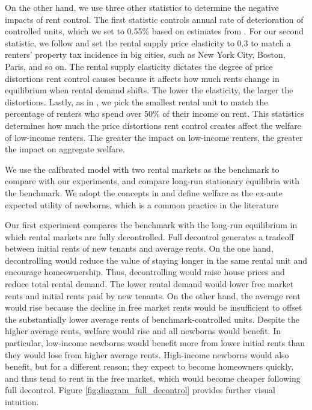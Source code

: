 \documentclass[parskip=full]{article}
\begin{document}
On the other hand, we use three other statistics to determine the negative impacts of rent control. The first statistic controls annual rate of deterioration of controlled units, which we set to 0.55\% based on estimates from \citet{murray_et_al-1991}. For our second statistic, we follow \citet{rs-2023} and set the rental supply price elasticity to 0.3 to match a renters' property tax incidence in big cities, such as New York City, Boston, Paris, and so on. The rental supply elasticity dictates the degree of price distortions rent control causes because it affects how much rents change in equilibrium when rental demand shifts. The lower the elasticity, the larger the distortions. Lastly, as in \citet{rs-2023}, we pick the smallest rental unit to match the percentage of renters who spend over 50\% of their income on rent. This statistics determines how much the price distortions rent control creates affect the welfare of low-income renters. The greater the impact on low-income renters, the greater the impact on aggregate welfare.   

We use the calibrated model with two rental markets as the benchmark to compare with our experiments, and compare long-run stationary equilibria with the benchmark. We adopt the concepts in \citet{ralws-1971} and define welfare as the ex-ante expected utility of newborns, which is a common practice in the literature \citep{conesa-et-al,gkkoc}

Our first experiment compares the benchmark with the long-run equilibrium in which rental markets are fully decontrolled. Full decontrol generates a tradeoff between initial rents of new tenants and average rents. On the one hand, decontrolling would reduce the value of staying longer in the same rental unit and encourage homeownership. Thus, decontrolling would raise house prices and reduce total rental demand. The lower rental demand would lower free market rents and initial rents paid by new tenants. On the other hand, the average rent would rise because the decline in free market rents would be insufficient to offset the substantially lower average rents of benchmark-controlled units. Despite the higher average rents, welfare would rise and all newborns would benefit. In particular, low-income newborns would benefit more from lower initial rents than they would lose from higher average rents. High-income newborns would also benefit, but for a different reason; they expect to become homeowners quickly, and thus tend to rent in the free market, which would become cheaper following full decontrol. Figure \ref{fig:diagram_full_decontrol} provides further visual intuition.
\end{document}
